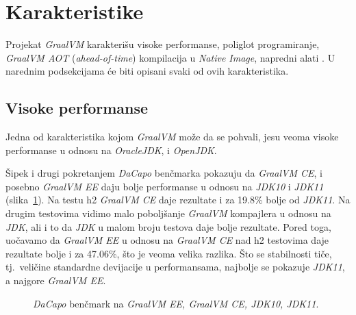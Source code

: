 \documentclass[a4paper]{article}
\begin{document}
\section{Karakteristike}
\label{sec:karakteristike}

Projekat \emph{GraalVM} karakterišu visoke performanse, poliglot programiranje, \emph{GraalVM AOT} (\emph{ahead-of-time}) kompilacija u \emph{Native Image}, napredni alati \cite{graalvm}. U narednim podsekcijama će biti opisani svaki od ovih karakteristika.

\subsection{Visoke performanse}
\label{sub:perf}

Jedna od karakteristika kojom \emph{GraalVM} može da se pohvali, jesu veoma visoke performanse u odnosu na \emph{OracleJDK}, i \emph{OpenJDK}. 

Šipek i drugi \cite{vsipek19} pokretanjem \emph{DaCapo} benčmarka \cite{dacapo} pokazuju da \emph{GraalVM CE}, i posebno \emph{GraalVM EE} daju bolje performanse u odnosu na \emph{JDK10} i \emph{JDK11} (slika~\ref{fig:dacapo}). Na testu h2 \emph{GraalVM CE} daje rezultate i za 19.8\% bolje od \emph{JDK11}. Na drugim testovima vidimo malo poboljšanje \emph{GraalVM} kompajlera u odnosu na \emph{JDK}, ali i to da \emph{JDK} u malom broju testova daje bolje rezultate. Pored toga, uočavamo da \emph{GraalVM EE} u odnosu na \emph{GraalVM CE} nad h2 testovima daje rezultate bolje i za 47.06\%, što je veoma velika razlika. Što se stabilnosti tiče, tj.\ veličine standardne devijacije u performansama, najbolje se pokazuje \emph{JDK11}, a najgore \emph{GraalVM EE}.

\begin{figure}
\begin{center}
\end{center}
    \caption{\emph{DaCapo} benčmark na \emph{GraalVM EE, GraalVM CE, JDK10, JDK11}.}
\label{fig:dacapo}
\end{figure}
\end{document}
